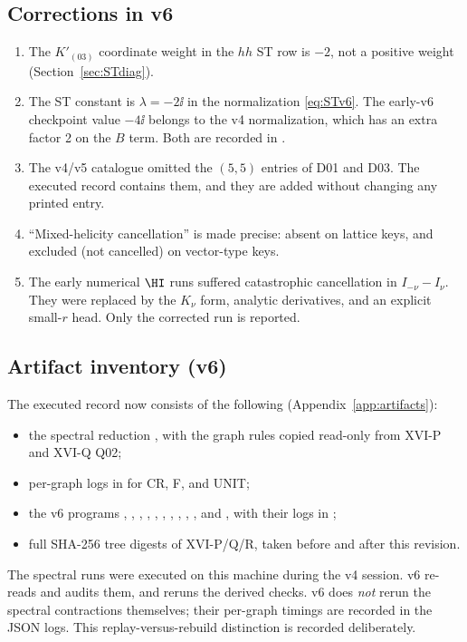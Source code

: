 \subsection{Corrections in v6}

\begin{enumerate}[label=\textup{(\roman*)}]
\item The \(K'_{(03)}\) coordinate weight in the \(hh\) ST row is
\(-2\), not a positive weight (Section~\ref{sec:STdiag}).
\item The ST constant is \(\lambda=-2\ii\) in the normalization
\eqref{eq:STv6}.
The early-v6 checkpoint value \(-4\ii\) belongs to the v4
normalization, which has an extra factor 2 on the \(B\) term.
Both are recorded in .
\item The v4/v5 catalogue omitted the \((5,5)\) entries of D01 and
D03.
The executed record contains them, and they are added without
changing any printed entry.
\item ``Mixed-helicity cancellation'' is made precise: absent on
lattice keys, and excluded (not cancelled) on vector-type keys.
\item The early numerical \(\HI\) runs suffered catastrophic
cancellation in \(I_{-\nu}-I_\nu\).
They were replaced by the \(K_\nu\) form, analytic derivatives,
and an explicit small-\(r\) head.
Only the corrected run is reported.
\end{enumerate}

\subsection{Artifact inventory (v6)}

The executed record now consists of the following
(Appendix~\ref{app:artifacts}):
\begin{itemize}
\item the spectral reduction , with the
graph rules copied read-only from XVI-P
 and XVI-Q Q02;
\item per-graph logs in  for CR, F, and UNIT;
\item the v6 programs , ,
, , ,
, , ,
, , and
, with their logs in ;
\item full SHA-256 tree digests of XVI-P/Q/R, taken before and after
this revision.
\end{itemize}
The  spectral runs were executed on this machine
during the v4 session.
v6 re-reads and audits them, and reruns the derived checks.
v6 does \emph{not} rerun the spectral contractions themselves;
their per-graph timings are recorded in the JSON logs.
This replay-versus-rebuild distinction is recorded deliberately.

